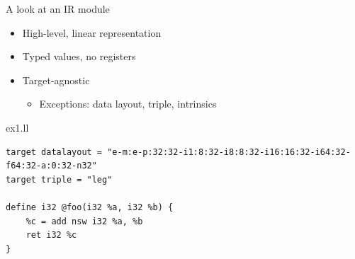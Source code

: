 
\begin{frame}[fragile]{A look at an IR module}

\begin{itemize}
    \item High-level, linear representation
    \item Typed values, no registers
    \item Target-agnostic
    \begin{itemize}
        \item Exceptions: data layout, triple, intrinsics
    \end{itemize}
\end{itemize}

\begin{block}{ex1.ll}
\begin{lstlisting}
target datalayout = "e-m:e-p:32:32-i1:8:32-i8:8:32-i16:16:32-i64:32-f64:32-a:0:32-n32"
target triple = "leg"

define i32 @foo(i32 %a, i32 %b) {
    %c = add nsw i32 %a, %b
    ret i32 %c
}
\end{lstlisting}
\end{block}

\end{frame}


